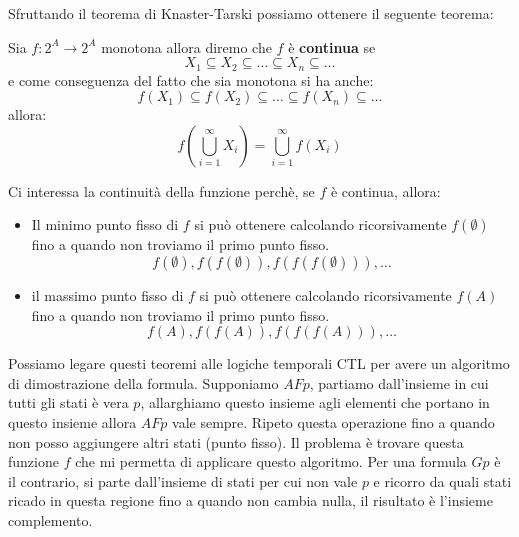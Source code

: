 Sfruttando il teorema di Knaster-Tarski possiamo ottenere il seguente teorema:
\begin{teorema}
    Sia $f:2^A \to 2^A$ monotona allora diremo che $f$ è \textbf{continua} se
    \begin{equation}
        X_1 \subseteq X_2 \subseteq \dots \subseteq X_n \subseteq \dots
    \end{equation}
    e come conseguenza del fatto che sia monotona si ha anche:
    \begin{equation}
        f(X_1) \subseteq f(X_2) \subseteq \dots \subseteq f(X_n) \subseteq \dots
    \end{equation}
    allora:
    \begin{equation}
        f(\bigcup_{i=1}^{\infty} X_i) = \bigcup_{i=1}^{\infty} f(X_i)
    \end{equation}
\end{teorema}
Ci interessa la continuità della funzione perchè, se $f$ è continua, allora:
\begin{itemize}
    \item Il minimo punto fisso di $f$ si può ottenere calcolando ricorsivamente
          $f(\emptyset)$ fino a quando non troviamo il primo punto fisso.
          \begin{equation}
              f(\emptyset), f(f(\emptyset)), f(f(f(\emptyset))), \dots
          \end{equation}
    \item il massimo punto fisso di $f$ si può ottenere calcolando ricorsivamente
          $f(A)$ fino a quando non troviamo il primo punto fisso.
          \begin{equation}
              f(A), f(f(A)), f(f(f(A))), \dots
          \end{equation}
\end{itemize}

Possiamo legare questi teoremi alle logiche temporali CTL per avere un algoritmo
di dimostrazione della formula. Supponiamo $AFp$, partiamo dall'insieme in cui
tutti gli stati è vera $p$, allarghiamo questo insieme agli elementi che portano in
questo insieme allora $AFp$ vale sempre. Ripeto questa operazione fino a quando
non posso aggiungere altri stati (punto fisso). Il problema è trovare questa
funzione $f$ che mi permetta di applicare questo algoritmo. Per una formula $Gp$
è il contrario, si parte dall'insieme di stati per cui non vale $p$ e ricorro da
quali stati ricado in questa regione fino a quando non cambia nulla, il risultato
è l'insieme complemento.
